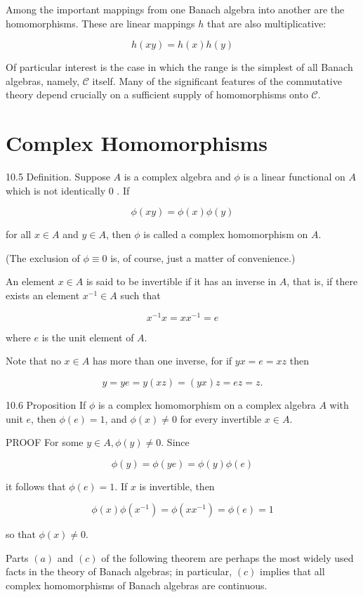 \documentclass[10pt]{article}
\begin{document}
Among the important mappings from one Banach algebra into another are the homomorphisms. These are linear mappings $h$ that are also multiplicative:

$$
h(x y)=h(x) h(y)
$$

Of particular interest is the case in which the range is the simplest of all Banach algebras, namely, $\mathscr{C}$ itself. Many of the significant features of the commutative theory depend crucially on a sufficient supply of homomorphisms onto $\mathscr{C}$.

\section{Complex Homomorphisms}
10.5 Definition. Suppose $A$ is a complex algebra and $\phi$ is a linear functional on $A$ which is not identically 0 . If

$$
\phi(x y)=\phi(x) \phi(y)
$$

for all $x \in A$ and $y \in A$, then $\phi$ is called a complex homomorphism on $A$.

(The exclusion of $\phi \equiv 0$ is, of course, just a matter of convenience.)

An element $x \in A$ is said to be invertible if it has an inverse in $A$, that is, if there exists an element $x^{-1} \in A$ such that

$$
x^{-1} x=x x^{-1}=e
$$

where $e$ is the unit element of $A$.

Note that no $x \in A$ has more than one inverse, for if $y x=e=x z$ then

$$
y=y e=y(x z)=(y x) z=e z=z .
$$

10.6 Proposition If $\phi$ is a complex homomorphism on a complex algebra $A$ with unit $e$, then $\phi(e)=1$, and $\phi(x) \neq 0$ for every invertible $x \in A$.

PROOF For some $y \in A, \phi(y) \neq 0$. Since

$$
\phi(y)=\phi(y e)=\phi(y) \phi(e)
$$

it follows that $\phi(e)=1$. If $x$ is invertible, then

$$
\phi(x) \phi\left(x^{-1}\right)=\phi\left(x x^{-1}\right)=\phi(e)=1
$$

so that $\phi(x) \neq 0$.

Parts $(a)$ and $(c)$ of the following theorem are perhaps the most widely used facts in the theory of Banach algebras; in particular, $(c)$ implies that all complex homomorphisms of Banach algebras are continuous.
\end{document}
